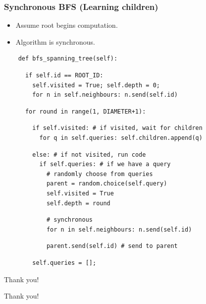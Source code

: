 \documentclass{beamer}
\begin{document}
\begin{frame}[fragile]
    \frametitle{Synchronous BFS (Learning children)}
    \begin{itemize}
        \item Assume root begins computation.
        \item Algorithm is synchronous.
    \end{itemize}

    \begin{verbatim}
    def bfs_spanning_tree(self):
    \end{verbatim}
    \begin{verbatim}
      if self.id == ROOT_ID:
        self.visited = True; self.depth = 0;
        for n in self.neighbours: n.send(self.id)
    \end{verbatim}
    \begin{verbatim}
      for round in range(1, DIAMETER+1):
    \end{verbatim}
    \begin{verbatim}
        if self.visited: # if visited, wait for children
          for q in self.queries: self.children.append(q)
    \end{verbatim}
    \begin{verbatim}
        else: # if not visited, run code
          if self.queries: # if we have a query
            # randomly choose from queries
            parent = random.choice(self.query)
            self.visited = True
            self.depth = round
    \end{verbatim}
    \begin{verbatim}
            # synchronous
            for n in self.neighbours: n.send(self.id)
    \end{verbatim}
    \begin{verbatim}
            parent.send(self.id) # send to parent
    \end{verbatim}
    \begin{verbatim}
        self.queries = [];
    \end{verbatim}
\end{frame}


\begin{frame}
    Thank you!
\end{frame}

\begin{frame}
    Thank you!
\end{frame}

\begin{frame}
\end{frame}

\begin{frame}
\end{frame}


\begin{frame}
\end{frame}
\end{document}

